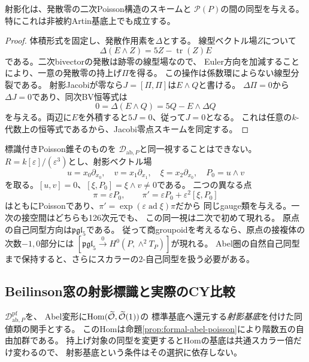 \begin{lemma}[発散零の持上げはスキームとして一意]
\label{lem:formal-unimodular-projective}
射影化は、発散零の二次Poisson構造のスキームと
$\mathcal P(P)$の間の同型を与える。
特にこれは非被約Artin基底上でも成立する。
\end{lemma}
\begin{proof}
体積形式を固定し、発散作用素を$\Delta$とする。
線型ベクトル場$Z$について
\[
 \Delta(E\wedge Z)=5Z-\operatorname{tr}(Z)E
\]
である。二次bivectorの発散は跡零の線型場なので、
Euler方向を加減することにより、一意の発散零の持上げ$\Pi$を得る。
この操作は係数環によらない線型分裂である。
射影Jacobiが零なら$J=[\Pi,\Pi]$は$E\wedge Q$と書ける。
$\Delta\Pi=0$から$\Delta J=0$であり、同次BV恒等式は
\[
 0=\Delta(E\wedge Q)=5Q-E\wedge\Delta Q
\]
を与える。両辺に$E$を外積すると$5J=0$、従って$J=0$となる。
これは任意の$k$-代数上の恒等式であるから、Jacobi零点スキームを同定する。
\end{proof}

\begin{remark}[接空間で見えないgauge同一視]
\label{rem:formal-gauge-counterexample}
標識付きPoisson錐そのものを
$\mathcal D_{\mathrm{ab},P}$と同一視することはできない。
$R=k[\varepsilon]/(\varepsilon^3)$とし、射影ベクトル場
\[
 u=x_0\partial_{x_0},\quad v=x_1\partial_{x_1},
 \quad\xi=x_2\partial_{x_0},\quad P_0=u\wedge v
\]
を取る。$[u,v]=0$、$[\xi,P_0]=\xi\wedge v\ne0$である。
二つの異なる点
\[
 \pi=\varepsilon P_0,
 \qquad \pi'=\varepsilon P_0+\varepsilon^2[\xi,P_0]
\]
はともにPoissonであり、$\pi'=\exp(\varepsilon\operatorname{ad}\xi)\pi$だから
同じgauge類を与える。一次の接空間はどちらも126次元でも、
この同一視は二次で初めて現れる。
原点の自己同型方向は$\mathfrak{pgl}_5$である。
従って商groupoidを考えるなら、原点の接複体の次数$-1,0$部分には
$[\mathfrak{pgl}_5\xrightarrow{0}H^0(P,\wedge^2T_P)]$が現れる。
Abel圏の自然自己同型まで保持すると、さらにスカラーの$2$-自己同型を扱う必要がある。
\end{remark}

\subsection{Beilinson窓の射影標識と実際のCY比較}

$\mathcal D^{\mathrm{pf}}_{\mathrm{ab},P}$を、
Abel変形に$\operatorname{Hom}(\widetilde{\mathcal O},\widetilde{\mathcal O}(1))$の
標準基底へ還元する\emph{射影基底}を付けた同値類の関手とする。
このHomは命題\ref{prop:formal-abel-poisson}により階数五の自由加群である。
持上げ対象の同型を変更するとHomの基底は共通スカラー倍だけ変わるので、
射影基底という条件はその選択に依存しない。

